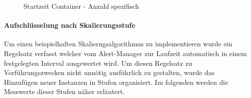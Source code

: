 \begin{figure}
  \centering
  \caption[Startzeit Container - Anzahl spezifisch]{Startzeit Container - Anzahl spezifisch}
  \label{fig:specContainers}
\end{figure}

\paragraph{Aufschlüsselung nach Skalierungsstufe}
Um einen beispielhaften Skalierngsalgorithmus zu implementieren wurde ein Regelsatz verfasst welcher vom Alert-Manager zur Laufzeit automatisch in einem festgelegten Interval ausgewertet wird. Um diesen Regelsatz zu Vorführungszwecken nicht unnötig ausführlich zu gestalten, wurde das Hinzufügen neuer Instanzen in Stufen organisiert. Im folgenden werden die Messwerte dieser Stufen näher erläutert. 



 
   



